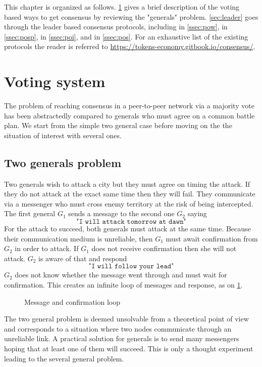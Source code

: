\noindent This chapter is organized as follows. \cref{sec:voting} gives a brief description of the voting based ways to get consensus by reviewing the "generals" problem. \cref{sec:leader} goes through the leader based consensus protocols, including \PoW in \cref{ssec:pow}, \PoSp in \cref{ssec:posp}, \PoI in \cref{ssec:poi}, and \PoS in \cref{ssec:pos}. For an exhaustive list of the existing protocols the reader is referred to \href{https://tokens-economy.gitbook.io/consensus/}{https://tokens-economy.gitbook.io/consensus/}.

\section{Voting system}\label{sec:voting} 
The problem of reaching consensus in a peer-to-peer network via a majority vote has been abstractedly compared to generals who must agree on a common battle plan. We start from the simple two general case before moving on the the situation of interest with several ones.
\subsection{Two generals problem}
Two generals wish to attack a city but they must agree on timing the attack. If they do not attack at the exact same time then they will fail. They communicate via a messenger who must cross enemy territory at the risk of being intercepted. The first general $G_1$ sends a message to the second one $G_2$ saying 
$$
\texttt{"I will attack tomorrow at dawn"}
$$
For the attack to succeed, both generals must attack at the same time. Because their communication medium is unreliable, then $G_1$ must await confirmation from $G_2$ in order to attack. If $G_1$ does not receive confirmation then she will not attack. $G_2$ is aware of that and respond 
$$
\texttt{"I will follow your lead"}
$$
$G_2$ does not know whether the message went through and must wait for confirmation. This creates an infinite loop of messages and response, as on \cref{fig:message_loop}.
\begin{figure}[ht!]
 \begin{center}
\end{center}
\caption{Message and confirmation loop}
\label{fig:message_loop}
\end{figure}
The two general problem is deemed unsolvable from a theoretical point of view and corresponds to a situation where two nodes communicate through an unreliable link. A practical solution for generals is to send many messengers hoping that at least one of them will succeed. This is only a thought experiment leading to the several general problem. 
